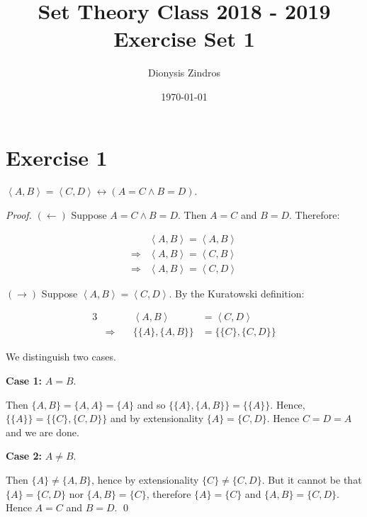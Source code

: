 \documentclass[11pt]{llncs}
\begin{document}
\title{
Set Theory Class 2018 - 2019\\
Exercise Set 1}
\date{\today}
\author{Dionysis Zindros\\
    }
\maketitle
\noindent
\makebox[\linewidth]{\small \today}

\thispagestyle{plain}

\section*{Exercise 1}
\begin{lemma}
$\left<A, B\right> = \left<C, D\right> \leftrightarrow (A = C \land B = D)$.
\end{lemma}
\begin{proof}
  \item $(\leftarrow)$
  Suppose $A = C \land B = D$. Then $A = C$ and $B = D$. Therefore:

  \begin{align*}
                &\left<A, B\right> = \left<A, B\right>\\
    \Rightarrow &\left<A, B\right> = \left<C, B\right>\\
    \Rightarrow &\left<A, B\right> = \left<C, D\right>
  \end{align*}

  \item $(\rightarrow)$
  Suppose $\left<A, B\right> = \left<C, D\right>$. By the Kuratowski definition:

  \begin{alignat*}{3}
                       &&\left<A, B\right> &= \left<C, D\right>\\
    & \Rightarrow\quad &\{\{A\}, \{A, B\}\} &= \{\{C\}, \{C, D\}\}
  \end{alignat*}

  We distinguish two cases.

  \textbf{Case 1:} $A = B$.

  Then $\{A, B\} = \{A, A\} = \{A\}$ and so $\{\{A\}, \{A, B\}\} = \{\{A\}\}$.
  Hence, $\{\{A\}\} = \{\{C\}, \{C, D\}\}$ and by extensionality
  $\{A\} = \{C, D\}$. Hence $C = D = A$ and we are done.

  \textbf{Case 2:} $A \neq B$.

  Then $\{A\} \neq \{A, B\}$, hence by extensionality $\{C\} \neq \{C, D\}$.
  But it cannot be that $\{A\} = \{C, D\}$ nor $\{A, B\} = \{C\}$,
  therefore $\{A\} = \{C\}$ and $\{A, B\} = \{C, D\}$. Hence $A = C$ and
  $B = D$.
  \qed
\end{proof}
\end{document}
